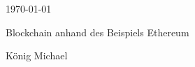 \documentclass[a4paper, 11pt]{article}
\begin{document}
\fancyhead[C]{}
\medskip
\begin{minipage}{0.295\textwidth}
\raggedright
\today\\
\end{minipage}
\begin{minipage}{0.4\textwidth}
\centering 
\Large
Blockchain anhand des Beispiels Ethereum \\
\end{minipage}
\begin{minipage}{0.295\textwidth}
\raggedleft
König Michael\\
\end{minipage}
\medskip



\printbibliography
\end{document}
